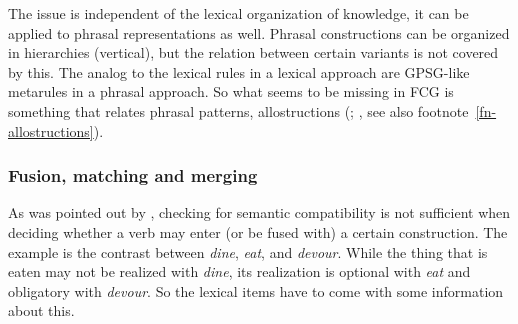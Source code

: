 The issue is independent of the lexical organization of knowledge, it can be applied to phrasal
representations as well. Phrasal constructions can be organized in hierarchies (vertical), but the
relation between certain variants is not covered by this. The analog to the lexical rules in a
lexical approach are GPSG-like metarules in a phrasal approach. So what seems to be missing in FCG
is something that relates phrasal patterns, \eg allostructions (\citealp{Cappelle2006a}; \citealp[]{Goldberg2014a}, see also footnote~\ref{fn-allostructions}).


\subsubsection{Fusion, matching and merging}

As was pointed out by \citet[--90]{Dowty89b-u}, checking for semantic compatibility is not sufficient
when deciding whether a verb may enter (or be fused with) a certain construction. The example is
the contrast between \emph{dine}, \emph{eat}, and \emph{devour}. While the thing that is eaten may
not be realized with \emph{dine}, its realization is optional with \emph{eat} and obligatory with
\emph{devour}. So the lexical items have to come with some information about
this. 

